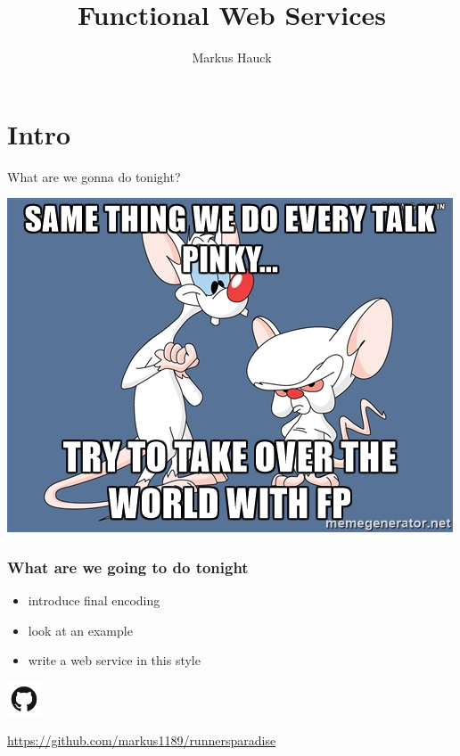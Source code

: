 \documentclass{beamer}
\author{Markus Hauck}
\institute{codecentric AG}
\title{Functional Web Services}
\begin{document}
{
  \begin{frame}
    \titlepage{}
  \end{frame}
}

\section{Intro}

\begin{frame}
  \begin{center}
    \huge
    What are we gonna do tonight?
  \end{center}
\end{frame}

\begin{frame}
  \begin{center}
    \includegraphics[width=0.7\paperwidth]{../pics/pinkybrain.jpg}
  \end{center}
\end{frame}

\begin{frame}
  \frametitle{What are we going to do tonight}
  \begin{itemize}
  \item introduce final encoding
  \item look at an example
  \item write a web service in this style
  \end{itemize}
  \vfill
  \begin{center}
    \includegraphics[height=10mm]{../pics/github.png}
  \end{center}
  \begin{center}
    \url{https://github.com/markus1189/runnersparadise}
  \end{center}
\end{frame}
\end{document}
